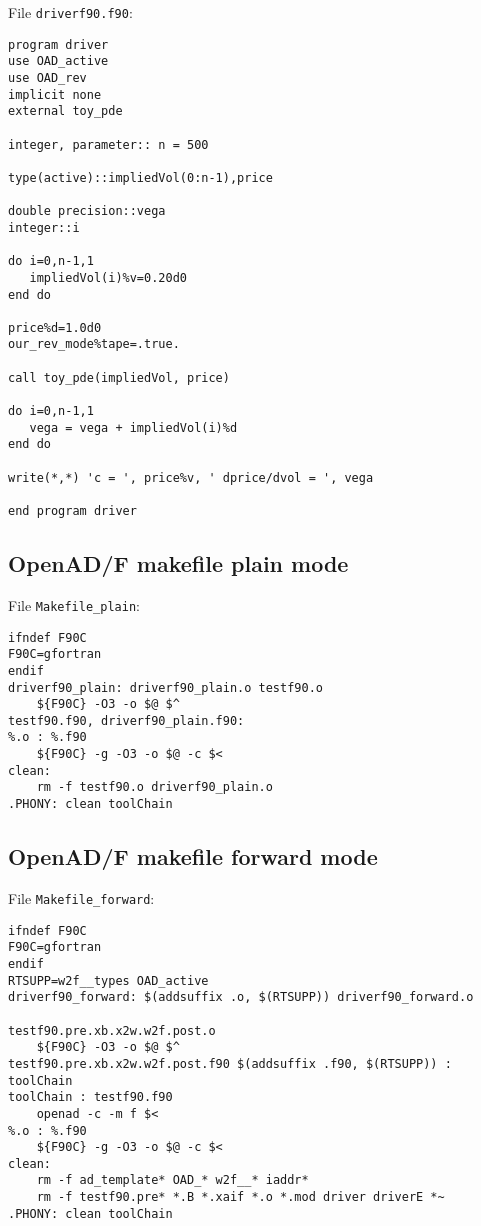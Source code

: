 \documentclass{amsart}
\theoremstyle{plain}
\numberwithin{equation}{section}
\begin{document}
\begin{appendix}
File \verb+driverf90.f90+:

\begin{verbatim}
program driver
use OAD_active
use OAD_rev
implicit none
external toy_pde

integer, parameter:: n = 500

type(active)::impliedVol(0:n-1),price

double precision::vega
integer::i

do i=0,n-1,1
   impliedVol(i)%v=0.20d0
end do

price%d=1.0d0
our_rev_mode%tape=.true.

call toy_pde(impliedVol, price)

do i=0,n-1,1
   vega = vega + impliedVol(i)%d
end do

write(*,*) 'c = ', price%v, ' dprice/dvol = ', vega

end program driver
\end{verbatim}

\subsection{OpenAD/F makefile plain mode}

File \verb+Makefile_plain+:

\begin{verbatim}
ifndef F90C
F90C=gfortran
endif
driverf90_plain: driverf90_plain.o testf90.o
	${F90C} -O3 -o $@ $^
testf90.f90, driverf90_plain.f90:
%.o : %.f90
	${F90C} -g -O3 -o $@ -c $<
clean:
	rm -f testf90.o driverf90_plain.o
.PHONY: clean toolChain
\end{verbatim}

\subsection{OpenAD/F makefile forward mode}

File \verb+Makefile_forward+:

\begin{verbatim}
ifndef F90C
F90C=gfortran
endif
RTSUPP=w2f__types OAD_active
driverf90_forward: $(addsuffix .o, $(RTSUPP)) driverf90_forward.o
                                              testf90.pre.xb.x2w.w2f.post.o
	${F90C} -O3 -o $@ $^
testf90.pre.xb.x2w.w2f.post.f90 $(addsuffix .f90, $(RTSUPP)) : toolChain
toolChain : testf90.f90
	openad -c -m f $<
%.o : %.f90
	${F90C} -g -O3 -o $@ -c $<
clean:
	rm -f ad_template* OAD_* w2f__* iaddr*
	rm -f testf90.pre* *.B *.xaif *.o *.mod driver driverE *~
.PHONY: clean toolChain
\end{verbatim}


\end{appendix}
\end{document}
